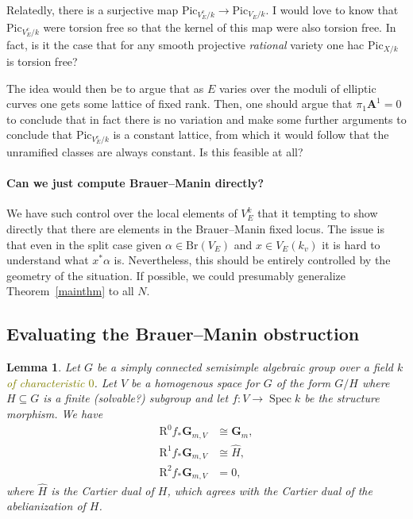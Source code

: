 \documentclass[10pt,letterpaper,twoside]{article}
\newcommand{\BA}[1]{\textcolor{olive}{#1}}
\newcommand{\R}{\mathrm{R}}
\renewcommand{\1}{\mathbf{1}}
\newcommand{\bA}{\mathbf{A}}
\newcommand{\bG}{\mathbf{G}}
\newcommand{\Gm}{\bG_{m}}
\newcommand{\Pic}{\mathrm{Pic}}
\newcommand{\Br}{\mathrm{Br}}
\DeclareMathOperator{\Spec}{Spec}
\newcommand{\iso}{\cong}
\theoremstyle{plain}
\newtheorem{lemma}[theorem]{Lemma}
\theoremstyle{plain}
\theoremstyle{definition}
\theoremstyle{named}
\theoremstyle{definition}
\begin{document}
	Relatedly, there is a surjective map $\Pic_{V^c_E/k}\rightarrow\Pic_{V_E/k}$. I would love to know
	that $\Pic_{V^c_E/k}$ were torsion free so that the kernel of this map were also torsion free. In
	fact, is it the case that for any smooth projective {\em rational} variety one hac $\Pic_{X/k}$ is
	torsion free?
	
	The idea would then be to argue that as $E$ varies over the moduli of elliptic curves one gets some
	lattice of fixed rank. Then, one should argue that $\pi_1\bA^1=0$ to conclude that in fact there is
	no variation and make some further arguments to conclude that $\Pic_{V^c_E/k}$ is a constant
	lattice, from which it would follow that the unramified classes are always constant. Is this
	feasible at all?
	
	\paragraph{Can we just compute Brauer--Manin directly?} We have such control over the local elements
	of $V_E^k$ that it tempting to show directly that there are elements in the Brauer--Manin fixed
	locus. The issue is that even in the split case given $\alpha\in\Br(V_E)$ and $x\in V_E(k_v)$ it is
	hard to understand what $x^*\alpha$ is.
	Nevertheless, this should be entirely controlled by the geometry of the situation. If possible, we
	could presumably generalize Theorem~\ref{mainthm} to all $N$.
	
	\subsection{Evaluating the Brauer--Manin obstruction}
	
	
	\begin{lemma}
		Let $G$ be a simply connected semisimple algebraic group over a field $k$ \BA{of characteristic
			$0$}. Let $V$ be a homogenous space for $G$ of
		the form $G/H$ where $H\subseteq G$ is a finite (solvable?) subgroup and let $f\colon
		V\rightarrow\Spec k$ be the structure morphism. We have
		\begin{align*}
			\R^0f_*\bG_{m,V}&\iso\Gm,\\
			\R^1f_*\bG_{m,V}&\iso\widehat{H},\\
			\R^2f_*\bG_{m,V}&=0,
		\end{align*}
		where $\widehat{H}$ is the Cartier dual of $H$, which agrees with the Cartier dual of the
		abelianization of $H$.
	\end{lemma}
	
\end{document}
